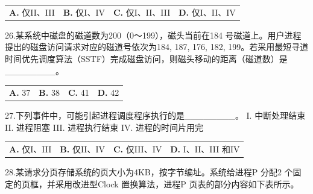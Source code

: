 \documentclass[UTF8,11pt]{ctexart}
\begin{document}
\begin{center}\begin{tabular}{>{\raggedright\arraybackslash}p{\dimexpr(\linewidth-8\tabcolsep)/4\relax}>{\raggedright\arraybackslash}p{\dimexpr(\linewidth-8\tabcolsep)/4\relax}>{\raggedright\arraybackslash}p{\dimexpr(\linewidth-8\tabcolsep)/4\relax}>{\raggedright\arraybackslash}p{\dimexpr(\linewidth-8\tabcolsep)/4\relax}}
\textbf{A.} 仅II、III & \textbf{B.} 仅I、IV & \textbf{C.} 仅I、II、III & \textbf{D.} 仅I、II、IV\\[.35em]\end{tabular}\end{center}

26.某系统中磁盘的磁道数为200（0～199），磁头当前在184 号磁道上。用户进程提出的磁盘访问请求对应的磁道号依次为184, 187, 176, 182, 199。若采用最短寻道时间优先调度算法（SSTF）完成磁盘访问，则磁头移动的距离（磁道数）是\_\_\_\_\_\_\_\_。


\begin{center}\begin{tabular}{>{\raggedright\arraybackslash}p{\dimexpr(\linewidth-8\tabcolsep)/4\relax}>{\raggedright\arraybackslash}p{\dimexpr(\linewidth-8\tabcolsep)/4\relax}>{\raggedright\arraybackslash}p{\dimexpr(\linewidth-8\tabcolsep)/4\relax}>{\raggedright\arraybackslash}p{\dimexpr(\linewidth-8\tabcolsep)/4\relax}}
\textbf{A.} 37 & \textbf{B.} 38 & \textbf{C.} 41 & \textbf{D.} 42\\[.35em]\end{tabular}\end{center}

27.下列事件中，可能引起进程调度程序执行的是\_\_\_\_\_\_\_\_。 I. 中断处理结束 II. 进程阻塞 III. 进程执行结束 IV. 进程的时间片用完


\begin{center}\begin{tabular}{>{\raggedright\arraybackslash}p{\dimexpr(\linewidth-8\tabcolsep)/4\relax}>{\raggedright\arraybackslash}p{\dimexpr(\linewidth-8\tabcolsep)/4\relax}>{\raggedright\arraybackslash}p{\dimexpr(\linewidth-8\tabcolsep)/4\relax}>{\raggedright\arraybackslash}p{\dimexpr(\linewidth-8\tabcolsep)/4\relax}}
\textbf{A.} 仅I、III & \textbf{B.} 仅II、IV & \textbf{C.} 仅III、IV & \textbf{D.} I、II、III 和IV\\[.35em]\end{tabular}\end{center}

28.某请求分页存储系统的页大小为4KB，按字节编址。系统给进程P 分配2 个固定的页框，并采用改进型Clock 置换算法，进程P 页表的部分内容如下表所示。 
\end{document}
